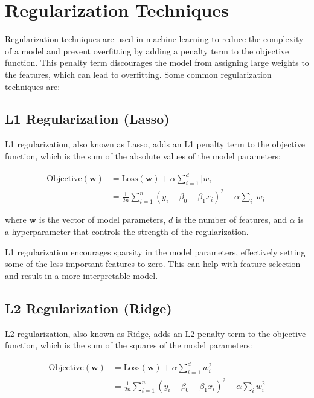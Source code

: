 \documentclass[12pt]{article}
\begin{document}
\section{Regularization Techniques}

Regularization techniques are used in machine learning to reduce the complexity of a model and prevent overfitting by adding a penalty term to the objective function. This penalty term discourages the model from assigning large weights to the features, which can lead to overfitting. Some common regularization techniques are:

\subsection{L1 Regularization (Lasso)}

L1 regularization, also known as Lasso, adds an L1 penalty term to the objective function, which is the sum of the absolute values of the model parameters:

\begin{align*}
	\text{Objective}(\boldsymbol{w}) &= \text{Loss}(\boldsymbol{w}) + \alpha \sum_{i=1}^{d} |w_i|\\
	&= \frac{1}{2n} \sum_{i=1}^n (y_i - \beta_0 - \beta_1 x_i)^2 + \alpha \sum_i |w_i|
\end{align*}


where $\boldsymbol{w}$ is the vector of model parameters, $d$ is the number of features, and $\alpha$ is a hyperparameter that controls the strength of the regularization.

L1 regularization encourages sparsity in the model parameters, effectively setting some of the less important features to zero. This can help with feature selection and result in a more interpretable model.

\subsection{L2 Regularization (Ridge)}

L2 regularization, also known as Ridge, adds an L2 penalty term to the objective function, which is the sum of the squares of the model parameters:

\begin{align*}
	\text{Objective}(\boldsymbol{w}) &= \text{Loss}(\boldsymbol{w}) + \alpha \sum_{i=1}^{d} w_i^2\\
	&= \frac{1}{2n} \sum_{i=1}^n (y_i - \beta_0 - \beta_1 x_i)^2 + \alpha \sum_i w_i^2
\end{align*}
\end{document}
